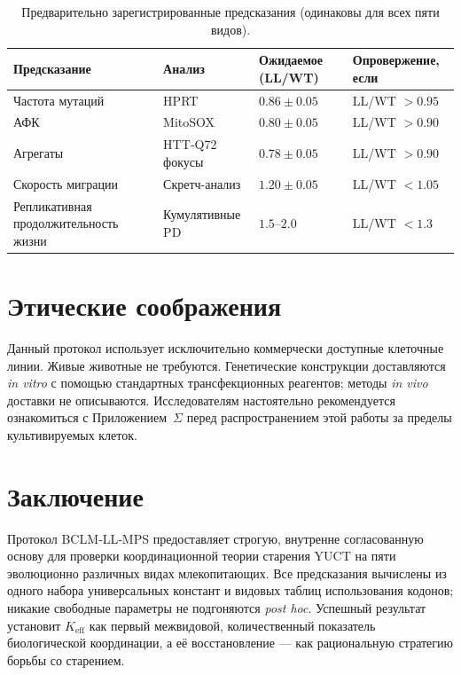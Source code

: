 \documentclass[12pt,a4paper]{article}
\begin{document}
	\begin{table}[H]
		\centering
		\caption{Предварительно зарегистрированные предсказания (одинаковы для всех пяти видов).}
		\label{tab:predictions}
		\begin{tabular}{@{}llll@{}}
			\toprule
			\textbf{Предсказание} & \textbf{Анализ} & \textbf{Ожидаемое (LL/WT)} & \textbf{Опровержение, если} \\
			\midrule
			Частота мутаций       & HPRT           & \(0.86 \pm 0.05\) & LL/WT \(> 0.95\) \\
			АФК                 & MitoSOX        & \(0.80 \pm 0.05\) & LL/WT \(> 0.90\) \\
			Агрегаты          & HTT‑Q72 фокусы   & \(0.78 \pm 0.05\) & LL/WT \(> 0.90\) \\
			Скорость миграции     & Скретч-анализ  & \(1.20 \pm 0.05\) & LL/WT \(< 1.05\) \\
			Репликативная продолжительность жизни & Кумулятивные PD  & \(1.5\)–\(2.0\)   & LL/WT \(< 1.3\) \\
			\bottomrule
		\end{tabular}
	\end{table}
	
	\section{Этические соображения}
	\label{sec:ethics}
	Данный протокол использует исключительно коммерчески доступные клеточные линии. Живые животные не требуются. Генетические конструкции доставляются \textit{in vitro} с помощью стандартных трансфекционных реагентов; методы \textit{in vivo} доставки не описываются. Исследователям настоятельно рекомендуется ознакомиться с Приложением~\(\Sigma\) перед распространением этой работы за пределы культивируемых клеток.
	
	\section{Заключение}
	\label{sec:conclusion}
	Протокол BCLM‑LL‑MPS предоставляет строгую, внутренне согласованную основу для проверки координационной теории старения YUCT на пяти эволюционно различных видах млекопитающих. Все предсказания вычислены из одного набора универсальных констант и видовых таблиц использования кодонов; никакие свободные параметры не подгоняются \textit{post hoc}. Успешный результат установит \(K_{\mathrm{eff}}\) как первый межвидовой, количественный показатель биологической координации, а её восстановление — как рациональную стратегию борьбы со старением.
	
\end{document}
